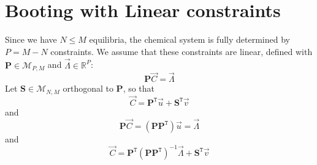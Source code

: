 \documentclass[aps,12pt]{revtex4}
\newcommand{\trn}[1]{{#1}^{\mathtt{T}}}
\begin{document}
\section{Booting  with Linear constraints}
Since we have $N\leq M$ equilibria, the chemical system is fully determined by
$P=M-N$ constraints.
We assume that these constraints are linear, defined with $\bm{P}\in\mathcal{M}_{P,M}$ and $\vec{\Lambda}\in\mathbb{R}^P$:
\begin{equation}
	\bm{P} \vec{C} = \vec{\Lambda}
\end{equation}
Let $\bm{S}\in\mathcal{M}_{N,M}$ orthogonal to $\bm{P}$, so that
\begin{equation}
	\vec{C} = \trn{\bm{P}} \vec{u} + \trn{\bm{S}} \vec{v}
\end{equation}
and
\begin{equation}
	\bm{P} \vec{C} = \left(\bm{P} \trn{\bm{P}}\right) \vec{u} = \vec{\Lambda}
\end{equation}
and
\begin{equation}
	\vec{C} = \trn{\bm{P}} \left(\bm{P} \trn{\bm{P}}\right)^{-1} \vec{\Lambda}+ \trn{\bm{S}} \vec{v}
\end{equation}
\end{document}

